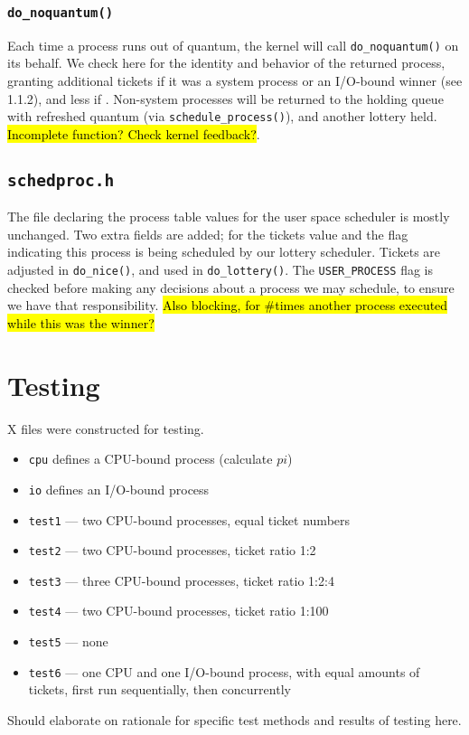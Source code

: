 \documentclass[10pt]{article}
\begin{document}
\subsubsection{\lstinline{do_noquantum()}}
Each time a process runs out of quantum, the kernel will call \lstinline{do_noquantum()} on its behalf. We check here for the identity and behavior of the returned process, granting additional tickets if it was a system process or an I/O-bound winner (see 1.1.2), and less if . Non-system processes will be returned to the holding queue with refreshed quantum (via \lstinline{schedule_process()}), and another lottery held. \hl{Incomplete function? Check kernel feedback?}.

\subsection{\lstinline{schedproc.h}}
The file declaring the process table values for the user space scheduler is mostly unchanged. Two extra fields are added; for the tickets value and the flag indicating this process is being scheduled by our lottery scheduler. Tickets are adjusted in \lstinline{do_nice()}, and used in \lstinline{do_lottery()}. The \lstinline{USER_PROCESS} flag is checked before making any decisions about a process we may schedule, to ensure we have that responsibility. \hl{Also blocking, for \#times another process executed while this was the winner?} 

\section{Testing}
X files were constructed for testing.

\begin{itemize}
\item \lstinline{cpu} defines a CPU-bound process (calculate $pi$)
\item \lstinline{io} defines an I/O-bound process
\item \lstinline{test1} --- two CPU-bound processes, equal ticket numbers
\item \lstinline{test2} --- two CPU-bound processes, ticket ratio 1:2
\item \lstinline{test3} --- three CPU-bound processes, ticket ratio 1:2:4
\item \lstinline{test4} --- two CPU-bound processes, ticket ratio 1:100
\item \lstinline{test5} --- none
\item \lstinline{test6} --- one CPU and one I/O-bound process, with equal amounts of tickets, first run sequentially, then concurrently 
\\
\end{itemize}

Should elaborate on rationale for specific test methods and results of testing here.
\end{document}

